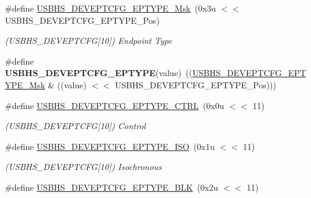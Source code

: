 \begin{DoxyCompactItemize}
\#define \mbox{\hyperlink{group__SAMV71__USBHS_ga1d958ff9ac36dece0834fdbc705fe4dc}{U\+S\+B\+H\+S\+\_\+\+D\+E\+V\+E\+P\+T\+C\+F\+G\+\_\+\+E\+P\+T\+Y\+P\+E\+\_\+\+Msk}}~(0x3u $<$$<$ U\+S\+B\+H\+S\+\_\+\+D\+E\+V\+E\+P\+T\+C\+F\+G\+\_\+\+E\+P\+T\+Y\+P\+E\+\_\+\+Pos)
\begin{DoxyCompactList}\small\item\em (U\+S\+B\+H\+S\+\_\+\+D\+E\+V\+E\+P\+T\+C\+FG\mbox{[}10\mbox{]}) Endpoint Type \end{DoxyCompactList}\item 
\mbox{\label{group__SAMV71__USBHS_gad59c403a7daeaa04dbaf5d2b56b5bf5b}} 
\#define {\bfseries U\+S\+B\+H\+S\+\_\+\+D\+E\+V\+E\+P\+T\+C\+F\+G\+\_\+\+E\+P\+T\+Y\+PE}(value)~((\mbox{\hyperlink{group__SAMV71__USBHS_ga1d958ff9ac36dece0834fdbc705fe4dc}{U\+S\+B\+H\+S\+\_\+\+D\+E\+V\+E\+P\+T\+C\+F\+G\+\_\+\+E\+P\+T\+Y\+P\+E\+\_\+\+Msk}} \& ((value) $<$$<$ U\+S\+B\+H\+S\+\_\+\+D\+E\+V\+E\+P\+T\+C\+F\+G\+\_\+\+E\+P\+T\+Y\+P\+E\+\_\+\+Pos)))
\item 
\mbox{\label{group__SAMV71__USBHS_gaad3788fed33d8c54c856093e2f45258f}} 
\#define \mbox{\hyperlink{group__SAMV71__USBHS_gaad3788fed33d8c54c856093e2f45258f}{U\+S\+B\+H\+S\+\_\+\+D\+E\+V\+E\+P\+T\+C\+F\+G\+\_\+\+E\+P\+T\+Y\+P\+E\+\_\+\+C\+T\+RL}}~(0x0u $<$$<$ 11)
\begin{DoxyCompactList}\small\item\em (U\+S\+B\+H\+S\+\_\+\+D\+E\+V\+E\+P\+T\+C\+FG\mbox{[}10\mbox{]}) Control \end{DoxyCompactList}\item 
\mbox{\label{group__SAMV71__USBHS_ga87d13f79eb203b988827d920c0fb3fb5}} 
\#define \mbox{\hyperlink{group__SAMV71__USBHS_ga87d13f79eb203b988827d920c0fb3fb5}{U\+S\+B\+H\+S\+\_\+\+D\+E\+V\+E\+P\+T\+C\+F\+G\+\_\+\+E\+P\+T\+Y\+P\+E\+\_\+\+I\+SO}}~(0x1u $<$$<$ 11)
\begin{DoxyCompactList}\small\item\em (U\+S\+B\+H\+S\+\_\+\+D\+E\+V\+E\+P\+T\+C\+FG\mbox{[}10\mbox{]}) Isochronous \end{DoxyCompactList}\item 
\mbox{\label{group__SAMV71__USBHS_ga0e7b543add6ac23998dae0d7eb75a5d5}} 
\#define \mbox{\hyperlink{group__SAMV71__USBHS_ga0e7b543add6ac23998dae0d7eb75a5d5}{U\+S\+B\+H\+S\+\_\+\+D\+E\+V\+E\+P\+T\+C\+F\+G\+\_\+\+E\+P\+T\+Y\+P\+E\+\_\+\+B\+LK}}~(0x2u $<$$<$ 11)
$$
\end{DoxyCompactItemize}
